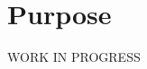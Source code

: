 \documentclass[../../DD.tex]{subfiles}
\begin{document}
\section{Purpose}
	WORK IN PROGRESS
	
\end{document}
